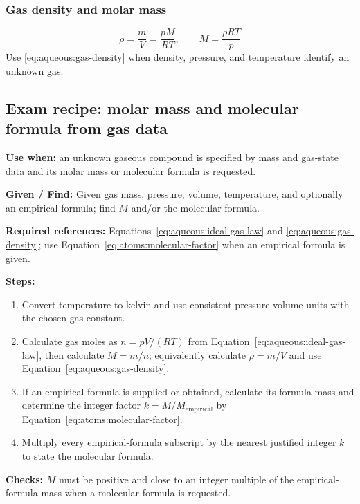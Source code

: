 \subsubsection{Gas density and molar mass}
\begin{equation}\label{eq:aqueous:gas-density}
\rho=\frac{m}{V}=\frac{pM}{RT}, \qquad M=\frac{\rho RT}{p}
\end{equation}
Use \eqref{eq:aqueous:gas-density} when density, pressure, and temperature identify an unknown gas.

\subsection{Exam recipe: molar mass and molecular formula from gas data}
\textbf{Use when:} an unknown gaseous compound is specified by mass and gas-state data and its molar mass or molecular formula is requested.

\textbf{Given / Find:} Given gas mass, pressure, volume, temperature, and optionally an empirical formula; find \(M\) and/or the molecular formula.

\textbf{Required references:} Equations~\eqref{eq:aqueous:ideal-gas-law} and \eqref{eq:aqueous:gas-density}; use Equation~\eqref{eq:atoms:molecular-factor} when an empirical formula is given.


\textbf{Steps:}
\begin{enumerate}
    \item Convert temperature to kelvin and use consistent pressure-volume units with the chosen gas constant.
    \item Calculate gas moles as \(n=pV/(RT)\) from Equation~\eqref{eq:aqueous:ideal-gas-law}, then calculate \(M=m/n\); equivalently calculate \(\rho=m/V\) and use Equation~\eqref{eq:aqueous:gas-density}.
    \item If an empirical formula is supplied or obtained, calculate its formula mass and determine the integer factor \(k=M/M_{\mathrm{empirical}}\) by Equation~\eqref{eq:atoms:molecular-factor}.
    \item Multiply every empirical-formula subscript by the nearest justified integer \(k\) to state the molecular formula.
\end{enumerate}

\textbf{Checks:} \(M\) must be positive and close to an integer multiple of the empirical-formula mass when a molecular formula is requested.

